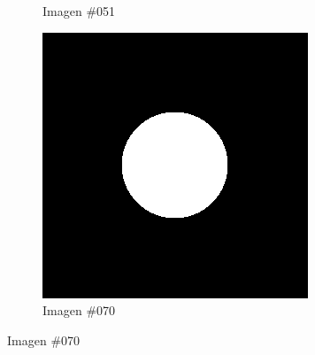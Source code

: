 \begin{figure}
\begin{subfigure}{0.30\textwidth}
		\caption{Imagen \#051}
		\label{f:implementacion:ImSphRad100:051}
	\end{subfigure}
	\begin{subfigure}{0.30\textwidth}
		\centering
		\includegraphics[width=\textwidth]{images/datasets/ImSphRad100/Sphere070.png}
		\caption{Imagen \#070}
		\label{f:implementacion:ImSphRad100:070}
	\end{subfigure}


\end{figure}
